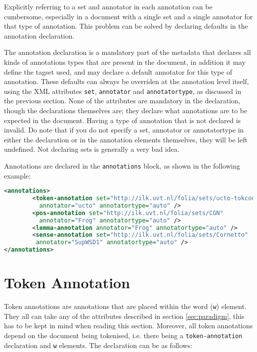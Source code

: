 \documentclass[a4paper,12pt]{report}
\begin{document}
Explicitly referring to a set and annotator in each annotation can be cumbersome, especially in a document with a single set and a single annotator for that type of annotation. This problem can be solved by declaring defaults in the annotation declaration.

The annotation declaration is a mandatory part of the metadata that declares all kinds of annotations types that are present in the document, in addition it may define the tagset used, and may declare a default annotator for this type of annotation. These defaults can always be overriden at the annotation level itself, using the XML attributes \texttt{set}, \texttt{annotator} and \texttt{annotatortype}, as discussed in the previous section. None of the attributes are mandatory in the declaration, though the declarations themselves are; they declare what annotations are to be expected in the document. Having a type of annotation that is not declared is invalid. Do note that if you do not specify a set, annotator or annotatortype in either the declaration or in the annotation elements themselves, they will be left undefined. Not declaring sets is generally a very bad idea.  

Annotations are declared in the \texttt{annotations} block, as shown in the following example:

\begin{lstlisting}[language=xml]
<annotations>
        <token-annotation set="http://ilk.uvt.nl/folia/sets/ucto-tokconfig-nl" 
          annotator="ucto" annotatortype="auto" />
        <pos-annotation set="http://ilk.uvt.nl/folia/sets/CGN" 
          annotator="Frog" annotatortype="auto" />
        <lemma-annotation annotator="Frog" annotatortype="auto" />    
        <sense-annotation set="http://ilk.uvt.nl/folia/sets/Cornetto"
         annotator="SupWSD1" annotatortype="auto" />    
</annotations>
\end{lstlisting}


\section{Token Annotation}

Token annotations are annotations that are placed within the word (\texttt{w}) element. They all can take any of the attributes described in section \ref{sec:paradigm}, this has to be kept in mind when reading this section. Moreover, all token annotations depend on the document being tokenised, i.e. there being a \texttt{token-annotation} declaration and \texttt{w} elements. The declaration can be as follows:
\end{document}
